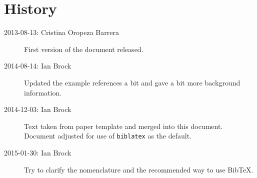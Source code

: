 \documentclass[UKenglish,texlive=2013]{latex/atlasdoc}
\newcommand*{\BibTeX}{Bib\TeX}
\newcommand{\Package}[1]{\texttt{#1}\xspace}
\begin{document}
\section*{History}

\begin{description}
\item[2013-08-13: Cristina Oropeza Barrera] First version of the document released.
\item[2014-08-14: Ian Brock] Updated the example references a bit and gave a bit more background information.
\item[2014-12-03: Ian Brock] Text taken from paper template and merged into this document. 
  Document adjusted for use of \Package{biblatex} as the default.
\item[2015-01-30: Ian Brock] Try to clarify the nomenclature and 
  the recommended way to use \BibTeX.
\end{description}

\printbibliography
%
%
\end{document}
